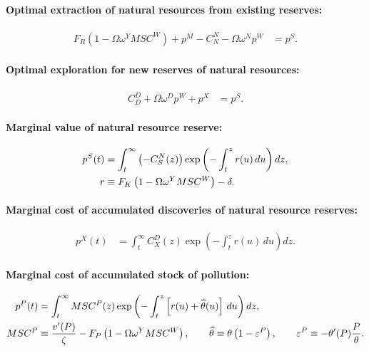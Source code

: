 \paragraph{Optimal extraction of natural resources from existing reserves:}
\begin{align}
F_R\left(1-\Omega\omega^Y MSC^W\right) + p^M - C_N^N - \Omega\omega^N p^W &= p^S.
\label{eq:first-best:optimal-extraction}
\end{align}

\paragraph{Optimal exploration for new reserves of natural resources:}
\begin{align}
C_D^D + \Omega\omega^D p^W + p^X &= p^S.
\label{eq:first-best:optimal-exploration}
\end{align}

\paragraph{Marginal value of natural resource reserve:}
\begin{align}
p^S(t) &= \int_t^{\infty} \left(-C_S^N(z)\right)
\exp\left(-\int_t^{z} r(u)\,du\right) dz,
\label{eq:first-best:reserve-shadow}
\\
r &\equiv F_K\left(1-\Omega\omega^Y MSC^W\right) - \delta.
\notag
\end{align}

\paragraph{Marginal cost of accumulated discoveries of natural resource reserves:}
\begin{align}
p^X(t) &= \int_t^{\infty} C_X^D(z)
\exp\left(-\int_t^{z} r(u)\,du\right) dz.
\label{eq:first-best:discovery-shadow}
\end{align}

\paragraph{Marginal cost of accumulated stock of pollution:}
\begin{align}
p^P(t) &= \int_t^{\infty} MSC^P(z)
\exp\left(-\int_t^{z} \left[r(u)+\widehat\theta(u)\right]\,du\right) dz,
\label{eq:first-best:pollution-shadow}
\\
MSC^P &\equiv \frac{v'(P)}{\zeta} - F_P\left(1-\Omega\omega^Y MSC^W\right),
\qquad 
\widehat\theta \equiv \theta\left(1-\varepsilon^P\right),
\qquad 
\varepsilon^P \equiv -\theta'(P)\frac{P}{\theta}.
\notag
\end{align}

